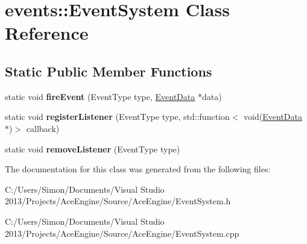 \hypertarget{classevents_1_1_event_system}{}\section{events\+:\+:Event\+System Class Reference}
\label{classevents_1_1_event_system}
\subsection*{Static Public Member Functions}
\begin{DoxyCompactItemize}
\item 
\hypertarget{classevents_1_1_event_system_a52182b9369c6211b65da6424e21ebe00}{}static void {\bfseries fire\+Event} (Event\+Type type, \hyperlink{structevents_1_1_event_data}{Event\+Data} $\ast$data)\label{classevents_1_1_event_system_a52182b9369c6211b65da6424e21ebe00}

\item 
\hypertarget{classevents_1_1_event_system_a7a76601b3d72825ddc1496c8ecfc466b}{}static void {\bfseries register\+Listener} (Event\+Type type, std\+::function$<$ void(\hyperlink{structevents_1_1_event_data}{Event\+Data} $\ast$)$>$ callback)\label{classevents_1_1_event_system_a7a76601b3d72825ddc1496c8ecfc466b}

\item 
\hypertarget{classevents_1_1_event_system_ab9b3f483b7eae6de6b3daa076290544b}{}static void {\bfseries remove\+Listener} (Event\+Type type)\label{classevents_1_1_event_system_ab9b3f483b7eae6de6b3daa076290544b}

\end{DoxyCompactItemize}


The documentation for this class was generated from the following files\+:\begin{DoxyCompactItemize}
\item 
C\+:/\+Users/\+Simon/\+Documents/\+Visual Studio 2013/\+Projects/\+Ace\+Engine/\+Source/\+Ace\+Engine/Event\+System.\+h\item 
C\+:/\+Users/\+Simon/\+Documents/\+Visual Studio 2013/\+Projects/\+Ace\+Engine/\+Source/\+Ace\+Engine/Event\+System.\+cpp\end{DoxyCompactItemize}
